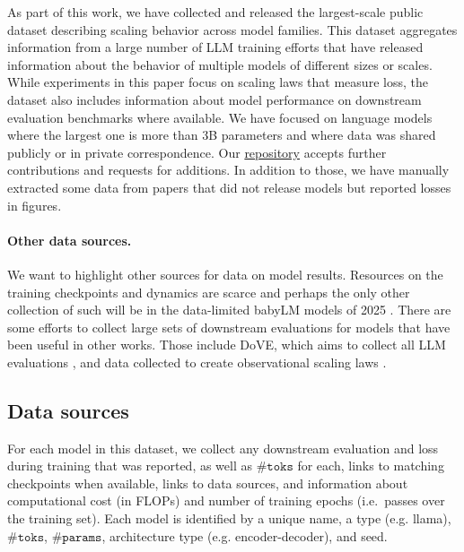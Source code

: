 \documentclass{article}
\theoremstyle{plain}
\theoremstyle{definition}
\theoremstyle{remark}
\newcommand{\mathmsize}{\#\texttt{params}}
\newcommand{\mathtokens}{\#\texttt{toks}}
\newcommand{\msize}{$\mathmsize{}$}
\newcommand{\tokens}{$\mathtokens{}$}
\newcommand{\final}[1]{#1}
\newcommand{\anon}[1]{}
\begin{document}
As part of this work, we have collected and released the largest-scale public dataset describing scaling behavior across model families.
This dataset aggregates information from a large number of LLM training efforts that have released information about the behavior of multiple models of different sizes or scales.
While experiments in this paper focus on scaling laws that measure loss, 
the dataset also includes information about model performance on downstream evaluation benchmarks where available. 
We have focused on language models where the largest one is more than 3B parameters and where data was shared publicly or in private correspondence. Our \final{\href{https://github.com/IBM/ColPret}{repository}}\anon{\href{https://anonymous.4open.science/r/ColPret-07BC}{repository}}  accepts further contributions and requests for additions. In addition to those, we have manually extracted some data from papers that did not release models but reported losses in figures.

\paragraph{Other data sources.} We want to highlight other sources for data on model results. Resources on the training checkpoints and dynamics are scarce and perhaps the only other collection of such will be in the data-limited babyLM models of 2025 \citep{charpentier2025babylmturns3papers}. There are some efforts to collect large sets of downstream evaluations for models that have been useful in other works. Those include DoVE, which aims to collect all LLM evaluations \citep{habba2025dovelargescalemultidimensionalpredictions}, and data collected to create observational scaling laws \citep{polo2024sloth,ruan2024observational}.

\subsection{Data sources}

For each model in this dataset, we collect any downstream evaluation and loss during training that was reported, as well as \tokens{} for each, links to matching checkpoints when available, links to data sources, and information about computational cost (in FLOPs) and number of training epochs (i.e.\ passes over the training set). Each model is identified by a unique name, a type (e.g. llama), \tokens{}, \msize{}, architecture type (e.g. encoder-decoder), and seed. 
\end{document}
